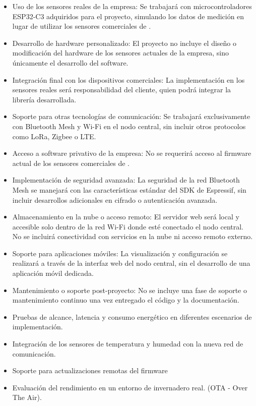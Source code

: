 \documentclass[
11pt, %
]{charter}
\begin{document}
\begin{itemize}
\item Uso de los sensores reales de la empresa: Se trabajará con microcontroladores ESP32-C3 adquiridos para el proyecto, simulando los datos de medición en lugar de utilizar los sensores comerciales de {\empclientename}.
\item Desarrollo de hardware personalizado: El proyecto no incluye el diseño o modificación del hardware de los sensores actuales de la empresa, sino únicamente el desarrollo del software.
\item Integración final con los dispositivos comerciales: La implementación en los sensores reales será responsabilidad del cliente, quien podrá integrar la librería desarrollada.
\item Soporte para otras tecnologías de comunicación: Se trabajará exclusivamente con Bluetooth Mesh y Wi-Fi en el nodo central, sin incluir otros protocolos como LoRa, Zigbee o LTE.
\item Acceso a software privativo de la empresa: No se requerirá acceso al firmware actual de los sensores comerciales de {\empclientename}.
\item Implementación de seguridad avanzada: La seguridad de la red Bluetooth Mesh se manejará con las características estándar del SDK de Espressif, sin incluir desarrollos adicionales en cifrado o autenticación avanzada.
\item Almacenamiento en la nube o acceso remoto: El servidor web será local y accesible solo dentro de la red Wi-Fi donde esté conectado el nodo central. No se incluirá conectividad con servicios en la nube ni acceso remoto externo.
\item Soporte para aplicaciones móviles: La visualización y configuración se realizará a través de la interfaz web del nodo central, sin el desarrollo de una aplicación móvil dedicada.
\item Mantenimiento o soporte post-proyecto: No se incluye una fase de soporte o mantenimiento continuo una vez entregado el código y la documentación.

\item Pruebas de alcance, latencia y consumo energético en diferentes escenarios de implementación.
\item Integración de los sensores de temperatura y humedad con la nueva red de comunicación.
\item Soporte para actualizaciones remotas del firmware
\item Evaluación del rendimiento en un entorno de invernadero real. (OTA - Over The Air).
\end{itemize}
\end{document}
